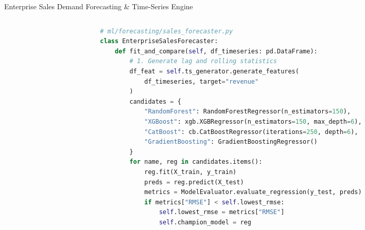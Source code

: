 \documentclass[10pt]{beamer}
\begin{document}
\begin{frame}[fragile]{Enterprise Sales Demand Forecasting \& Time-Series Engine}
\begin{columns}[T]
\begin{column}{0.50\textwidth}
    \end{column}%
    \begin{column}{0.46\textwidth}
\begin{lstlisting}[language=Python]
# ml/forecasting/sales_forecaster.py
class EnterpriseSalesForecaster:
    def fit_and_compare(self, df_timeseries: pd.DataFrame):
        # 1. Generate lag and rolling statistics
        df_feat = self.ts_generator.generate_features(
            df_timeseries, target="revenue"
        )
        candidates = {
            "RandomForest": RandomForestRegressor(n_estimators=150),
            "XGBoost": xgb.XGBRegressor(n_estimators=150, max_depth=6),
            "CatBoost": cb.CatBoostRegressor(iterations=250, depth=6),
            "GradientBoosting": GradientBoostingRegressor()
        }
        for name, reg in candidates.items():
            reg.fit(X_train, y_train)
            preds = reg.predict(X_test)
            metrics = ModelEvaluator.evaluate_regression(y_test, preds)
            if metrics["RMSE"] < self.lowest_rmse:
                self.lowest_rmse = metrics["RMSE"]
                self.champion_model = reg
\end{lstlisting}
    \end{column}
\end{columns}
\end{frame}
\end{document}
